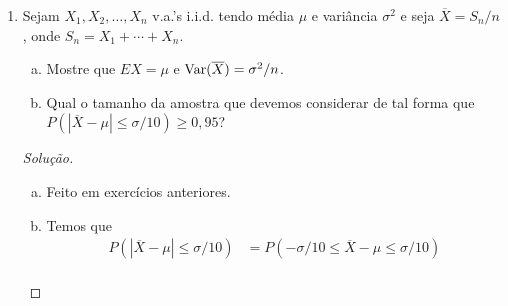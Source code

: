 \documentclass[../Notas.tex]{subfiles}
\begin{document}
\begin{enumerate}
\begin{proof}[Solução]
\begin{enumerate}[a)]
\begin{align*}
                           = \prod_{i=1}^n \frac{1}{1 - t/\lambda}
                           =  \frac{1}{(1 - t/\lambda)^n}
                           = \left(\frac{\lambda}{\lambda - t}\right)^n, \, t < \lambda.
            \end{align*}
            Portanto, $S_n\sim\Gamma(n, \lambda)$.
            \item Temos
            \begin{align*}
                M_{S_n}(t) = \prod_{i=1}^n M_{X_i}(t)
                           = \prod_{i=1}^n (pe^t + 1 - p)^{n_i}
                           = (pe^t + 1 - p)^{\sum_i n_i}, \, \forall t\in\mathbb{R}.
            \end{align*}
            Portanto, $S_n\sim B\left( \sum_i n_i, p \right)$.
            \item Temos
            \begin{align*}
                M_{S_n}(t) = \prod_{i=1}^n M_{X_i}(t)
                           = \prod_{i=1}^n \exp(\lambda_i(e^t - 1))
                           = \exp\left[ (e^t - 1)\sum_i \lambda_i \right], \, 
                           \forall t\in\mathbb{R}.
            \end{align*}
            Portanto, $S_n\sim\text{Poisson}\left(\sum_i\lambda_i\right)$.
        \end{enumerate}
    \end{proof}
    \item Sejam $X_1, X_2,\dots, X_n$ v.a.'s i.i.d. tendo média $\mu$ e variância $\sigma^2$ e seja $\overline{X} = S_n/n$, onde $S_n = X_1 + \cdots + X_n$.
    \begin{enumerate}[a)]
    \item Mostre que $EX = \mu$ e $\text{Var}(\overline{X}) = \sigma^2/n$.
    \item Qual o tamanho da amostra que devemos considerar de tal forma que $P(|\overline{X} - \mu| \leq \sigma/10) \geq 0,95$?
    \end{enumerate}
    \begin{proof}[Solução]
        \begin{enumerate}[a)]
            \item Feito em exercícios anteriores.
            \item Temos que
            \begin{align*}
                P(|\overline{X} - \mu| \leq \sigma/10) &= P(-\sigma/10 \leq \overline{X} - \mu \leq \sigma/10) \\

\end{align*}
\end{enumerate}
\end{proof}
\end{enumerate}
\end{document}
